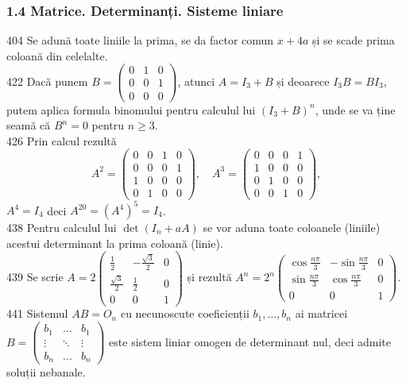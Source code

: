 \documentclass[11pt]{article}
\begin{document}
\subsubsection*{1.4 Matrice. Determinanți. Sisteme liniare}
404 Se adună toate liniile la prima, se da factor comun $x+4 a$ și se scade prima coloană din celelalte.\\
422 Dacă punem $B=\left(\begin{array}{lll}0 & 1 & 0 \\ 0 & 0 & 1 \\ 0 & 0 & 0\end{array}\right)$, atunci $A=I_{3}+B$ și deoarece $I_{3} B=B I_{3}$, putem aplica formula binomului pentru calculul lui $\left(I_{3}+B\right)^{n}$, unde se va ține seamă că $B^{n}=0$ pentru $n \geq 3$.\\
426 Prin calcul rezultă $$A^{2}=\left(\begin{array}{llll}0 & 0 & 1 & 0 \\0 & 0 & 0 & 1 \\1 & 0 & 0 & 0 \\0 & 1 & 0 & 0\end{array}\right), \quad A^{3}=\left(\begin{array}{llll}0 & 0 & 0 & 1 \\1 & 0 & 0 & 0 \\0 & 1 & 0 & 0 \\0 & 0 & 1 & 0\end{array}\right),$$ $A^{4}=I_{4}$ deci $A^{20}=\left(A^{4}\right)^{5}=I_{4}$.\\
438 Pentru calculul lui $\operatorname{det}\left(I_{n}+a A\right)$ se vor aduna toate coloanele (liniile) acestui determinant la prima coloană (linie).\\
439 Se scrie $A=2\left(\begin{array}{rrr}\frac{1}{2} & -\frac{\sqrt{3}}{2} & 0 \\ \frac{\sqrt{3}}{2} & \frac{1}{2} & 0 \\ 0 & 0 & 1\end{array}\right)$ și rezultă $A^{n}=2^{n}\left(\begin{array}{ccc}\cos \frac{n \pi}{3} & -\sin \frac{n \pi}{3} & 0 \\ \sin \frac{n \pi}{3} & \cos \frac{n \pi}{3} & 0 \\ 0 & 0 & 1\end{array}\right)$.\\
441 Sistemul $A B=O_{n}$ cu necunoscute coeficienții $b_{1}, \ldots, b_{n}$ ai matricei $B=\left(\begin{array}{ccc}b_{1} & \ldots & b_{1} \\ \vdots & \ddots & \vdots \\ b_{n} & \ldots & b_{n}\end{array}\right)$ este sistem liniar omogen de determinant nul, deci admite soluții nebanale.\\
\end{document}
